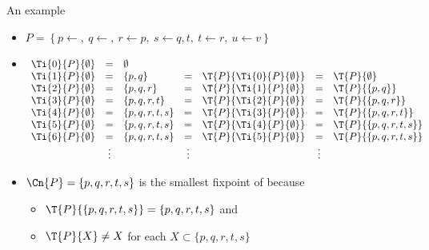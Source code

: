 \begin{frame}{An example}
  \begin{itemize}
  \item
    \(
    P
    =
    \left\{
      p \leftarrow ,           \
      q \leftarrow ,           \
      r \leftarrow p,          \
      s \leftarrow q, t,       \
      t \leftarrow r,          \
      u \leftarrow v
    \right\}
    \)
    \medskip
  \item<2->
    \(
    \begin{array}[t]{lclclcl}
      \Ti{0}{P}{\emptyset}&=&\emptyset    & &                           & &                    \\
      \Ti{1}{P}{\emptyset}&=&\{p,q\}      &=&\T{P}{\Ti{0}{P}{\emptyset}}&=&\T{P}{\emptyset}    \\
      \Ti{2}{P}{\emptyset}&=&\{p,q,r\}    &=&\T{P}{\Ti{1}{P}{\emptyset}}&=&\T{P}{\{p,q\}}      \\
      \Ti{3}{P}{\emptyset}&=&\{p,q,r,t\}  &=&\T{P}{\Ti{2}{P}{\emptyset}}&=&\T{P}{\{p,q,r\}}    \\
      \Ti{4}{P}{\emptyset}&=&\{p,q,r,t,s\}&=&\T{P}{\Ti{3}{P}{\emptyset}}&=&\T{P}{\{p,q,r,t\}}  \\
      \Ti{5}{P}{\emptyset}&=&\{p,q,r,t,s\}&=&\T{P}{\Ti{4}{P}{\emptyset}}&=&\T{P}{\{p,q,r,t,s\}}\\
      \Ti{6}{P}{\emptyset}&=&\{p,q,r,t,s\}&=&\T{P}{\Ti{5}{P}{\emptyset}}&=&\T{P}{\{p,q,r,t,s\}}\\
                       &\vdots&        &\vdots&                      &\vdots&
    \end{array}
    \)

    \smallskip
  \item<3-> $\Cn{P}=\{p,q,r,t,s\}$ is the smallest fixpoint of \Top{P}
    because
    \begin{itemize}\normalsize
    \item $\T{P}{\{p,q,r,t,s\}}=\{p,q,r,t,s\}$ and
    \item $\T{P}{X}\neq X$ for each $X\subset  \{p,q,r,t,s\}$
    \end{itemize}
  \end{itemize}
  \smallskip
\end{frame}
%
